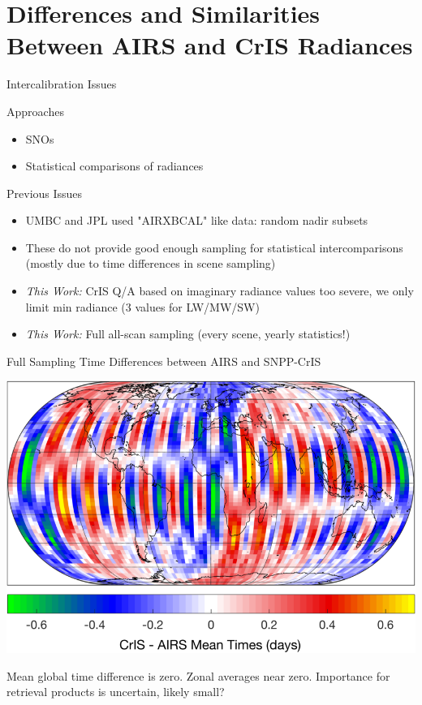 \documentclass[10pt,t]{beamer}
\begin{document}
\section{Differences and Similarities Between AIRS and CrIS Radiances}
\label{sec:org4822a7d}

\begin{frame}[label={sec:org9f1eae7}]{Intercalibration Issues}
\begin{block}{Approaches}
\begin{itemize}
\item SNOs
\item Statistical comparisons of radiances
\end{itemize}
\end{block}

\begin{block}{Previous Issues}
\begin{itemize}
\item UMBC and JPL used "AIRXBCAL" like data: random nadir subsets
\item These do not provide good enough sampling for statistical intercomparisons (mostly due to time differences in scene sampling)
\item \emph{This Work:} CrIS Q/A based on imaginary radiance values too severe, we only limit min radiance (3 values for LW/MW/SW)
\item \emph{This Work:} Full all-scan sampling (every scene, yearly statistics!)
\end{itemize}
\end{block}
\end{frame}

\begin{frame}[label={sec:org62cd722}]{Full Sampling Time Differences between AIRS and SNPP-CrIS}
\begin{center}
\includegraphics[width=0.8\linewidth]{./Figs/Png/airs_vs_cris_allscan_tdiff_days.png}
\end{center}

Mean global time difference is zero.  Zonal averages near zero.  Importance for retrieval products is uncertain, likely small?
\end{frame}
\end{document}
